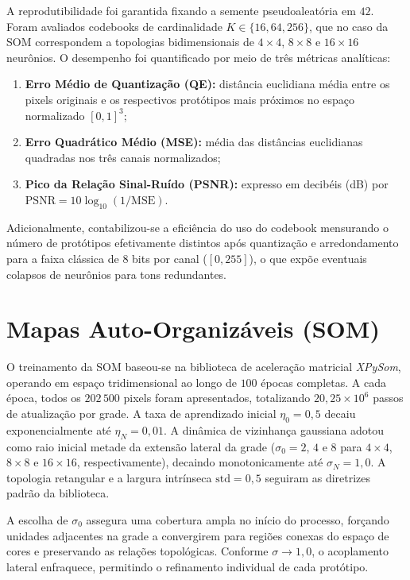 \documentclass[11pt,a4paper]{article}
\begin{document}
A reprodutibilidade foi garantida fixando a semente pseudoaleatória em $42$. Foram avaliados codebooks de cardinalidade $K \in \{16, 64, 256\}$, que no caso da SOM correspondem a topologias bidimensionais de $4 \times 4$, $8 \times 8$ e $16 \times 16$ neurônios. O desempenho foi quantificado por meio de três métricas analíticas:
\begin{enumerate}
    \item \textbf{Erro Médio de Quantização (QE):} distância euclidiana média entre os pixels originais e os respectivos protótipos mais próximos no espaço normalizado $[0, 1]^3$;
    \item \textbf{Erro Quadrático Médio (MSE):} média das distâncias euclidianas quadradas nos três canais normalizados;
    \item \textbf{Pico da Relação Sinal-Ruído (PSNR):} expresso em decibéis (dB) por $\mathrm{PSNR} = 10 \log_{10}(1/\mathrm{MSE})$.
\end{enumerate}

Adicionalmente, contabilizou-se a eficiência do uso do codebook mensurando o número de protótipos efetivamente distintos após quantização e arredondamento para a faixa clássica de $8$ bits por canal ($[0, 255]$), o que expõe eventuais colapsos de neurônios para tons redundantes.
\section{Mapas Auto-Organizáveis (SOM)}

O treinamento da SOM baseou-se na biblioteca de aceleração matricial \textit{XPySom}, operando em espaço tridimensional ao longo de $100$ épocas completas. A cada época, todos os $202\,500$ pixels foram apresentados, totalizando $20{,}25 \times 10^6$ passos de atualização por grade. A taxa de aprendizado inicial $\eta_0 = 0{,}5$ decaiu exponencialmente até $\eta_N = 0{,}01$. A dinâmica de vizinhança gaussiana adotou como raio inicial metade da extensão lateral da grade ($\sigma_0 = 2$, $4$ e $8$ para $4 \times 4$, $8 \times 8$ e $16 \times 16$, respectivamente), decaindo monotonicamente até $\sigma_N = 1{,}0$. A topologia retangular e a largura intrínseca $\mathrm{std} = 0{,}5$ seguiram as diretrizes padrão da biblioteca.

A escolha de $\sigma_0$ assegura uma cobertura ampla no início do processo, forçando unidades adjacentes na grade a convergirem para regiões conexas do espaço de cores e preservando as relações topológicas. Conforme $\sigma \to 1{,}0$, o acoplamento lateral enfraquece, permitindo o refinamento individual de cada protótipo.
\end{document}
